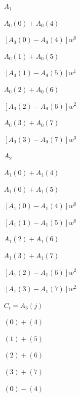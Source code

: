 \documentclass[UTF8,fontset=fandol,a4paper]{ctexart}
\begin{document}
\noindent $A_1$\par

\noindent $A_0(0)+A_0(4)$\par

\noindent $[A_0(0)-A_0(4)]w^0$\par

\noindent $A_0(1)+A_0(5)$\par

\noindent $[A_0(1)-A_0(5)]w^1$\par

\noindent $A_0(2)+A_0(6)$\par

\noindent $[A_0(2)-A_0(6)]w^2$\par

\noindent $A_0(3)+A_0(7)$\par

\noindent $[A_0(3)-A_0(7)]w^3$\par

\noindent $A_2$\par

\noindent $A_1(0)+A_1(4)$\par

\noindent $A_1(0)+A_1(5)$\par

\noindent $[A_1(0)-A_1(4)]w^0$\par

\noindent $[A_1(1)-A_1(5)]w^0$\par

\noindent $A_1(2)+A_1(6)$\par

\noindent $A_1(3)+A_1(7)$\par

\noindent $[A_1(2)-A_1(6)]w^2$\par

\noindent $[A_1(3)-A_1(7)]w^2$\par

\noindent $C_i=A_3(j)$\par

\noindent $(0)+(4)$\par

\noindent $(1)+(5)$\par

\noindent $(2)+(6)$\par

\noindent $(3)+(7)$\par

\noindent $(0)-(4)$\par
\end{document}
